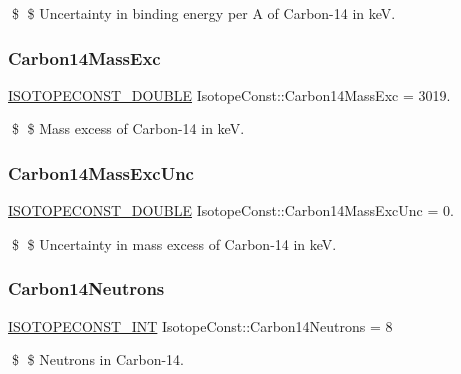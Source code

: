 \$ \$ Uncertainty in binding energy per A of Carbon-\/14 in keV. \mbox{\label{group___isotope_const-_carbon-_c14_gab3c2e9a1a8831126615196a547a62341}} 
\subsubsection{\texorpdfstring{Carbon14\+Mass\+Exc}{Carbon14MassExc}}
{\footnotesize\ttfamily \mbox{\hyperlink{group___isotope_const-_macros_ga8f45a7272ce02c0b4c65c44636ed719a}{I\+S\+O\+T\+O\+P\+E\+C\+O\+N\+S\+T\+\_\+\+D\+O\+U\+B\+LE}} Isotope\+Const\+::\+Carbon14\+Mass\+Exc = 3019.}

\$ \$ Mass excess of Carbon-\/14 in keV. \mbox{\label{group___isotope_const-_carbon-_c14_ga42c4f9dd8ca8780d6553556cb70a1f9d}} 
\subsubsection{\texorpdfstring{Carbon14\+Mass\+Exc\+Unc}{Carbon14MassExcUnc}}
{\footnotesize\ttfamily \mbox{\hyperlink{group___isotope_const-_macros_ga8f45a7272ce02c0b4c65c44636ed719a}{I\+S\+O\+T\+O\+P\+E\+C\+O\+N\+S\+T\+\_\+\+D\+O\+U\+B\+LE}} Isotope\+Const\+::\+Carbon14\+Mass\+Exc\+Unc = 0.}

\$ \$ Uncertainty in mass excess of Carbon-\/14 in keV. \mbox{\label{group___isotope_const-_carbon-_c14_ga27dacc948f6ae06a5991ff37f7dabc4e}} 
\subsubsection{\texorpdfstring{Carbon14\+Neutrons}{Carbon14Neutrons}}
{\footnotesize\ttfamily \mbox{\hyperlink{group___isotope_const-_macros_ga5f18360b3e99483a35c32d789e62621c}{I\+S\+O\+T\+O\+P\+E\+C\+O\+N\+S\+T\+\_\+\+I\+NT}} Isotope\+Const\+::\+Carbon14\+Neutrons = 8}

\$ \$ Neutrons in Carbon-\/14. \mbox{\label{group___isotope_const-_carbon-_c14_gaa3de74dac29f99d58605443dff6628bf}} 
